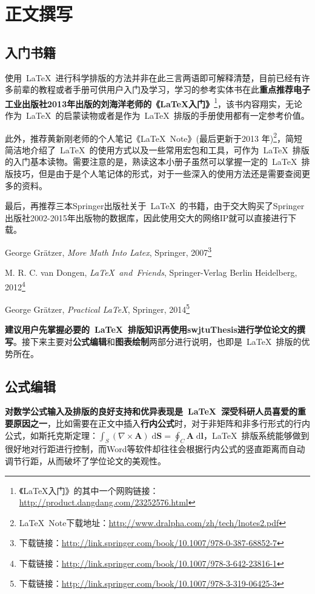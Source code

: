 \section{正文撰写}

\subsection{入门书籍}
使用~\LaTeX{}~进行科学排版的方法并非在此三言两语即可解释清楚，目前已经有许多前辈的教程或者手册可供用户入门及学习，学习的参考实体书在此\textbf{重点推荐电子工业出版社2013年出版的刘海洋老师的《\LaTeX{}入门》}\footnote{《\LaTeX{}入门》的其中一个网购链接：\url{http://product.dangdang.com/23252576.html}}，该书内容翔实，无论作为~\LaTeX{}~的启蒙读物或者是作为~\LaTeX{}~排版的手册使用都有一定参考价值。

\par
此外，推荐黄新刚老师的个人笔记《\LaTeX{}~Note》(最后更新于2013 年)\footnote{\LaTeX{}~Note下载地址：\url{http://www.dralpha.com/zh/tech/lnotes2.pdf}}，简短简洁地介绍了~\LaTeX{}~的使用方式以及一些常用宏包和工具，可作为~\LaTeX{}~排版的入门基本读物。需要注意的是，熟读这本小册子虽然可以掌握一定的~\LaTeX{}~排版技巧，但是由于是个人笔记体的形式，对于一些深入的使用方法还是需要查阅更多的资料。

\par
最后，再推荐三本Springer出版社关于~\LaTeX{}~的书籍，由于交大购买了Springer出版社2002-2015年出版物的数据库，因此使用交大的网络IP就可以直接进行下载。
\begin{publist}
	\item George Grätzer, \emph{More Math Into Latex}, Springer, 2007\footnote{下载链接：\url{http://link.springer.com/book/10.1007/978-0-387-68852-7}}
	\item M. R. C. van Dongen, \emph{\LaTeX{}~and~Friends}, Springer-Verlag Berlin Heidelberg, 2012\footnote{下载链接：\url{http://link.springer.com/book/10.1007/978-3-642-23816-1}}
	\item George Grätzer, \emph{Practical LaTeX}, Springer, 2014\footnote{下载链接：\url{http://link.springer.com/book/10.1007/978-3-319-06425-3}}
\end{publist}

\textbf{建议用户先掌握必要的~\LaTeX{}~排版知识再使用swjtuThesis进行学位论文的撰写}。接下来主要对\textbf{公式编辑}和\textbf{图表绘制}两部分进行说明，也即是~\LaTeX{}~排版的优势所在。

\subsection{公式编辑}
\textbf{对数学公式输入及排版的良好支持和优异表现是~\LaTeX{}~深受科研人员喜爱的重要原因之一}，比如需要在正文中插入\textbf{行内公式}时，对于非矩阵和非多行形式的行内公式，如斯托克斯定理：$\int_S\left( \nabla\times \mathbf{A}\right)  \;\mathrm{d}\mathbf{S}=\oint_C \mathbf{A} \;\mathrm{d}\mathbf{l}$，\LaTeX{}~排版系统能够做到很好地对行距进行控制，而Word等软件却往往会根据行内公式的竖直距离而自动调节行距，从而破坏了学位论文的美观性。

